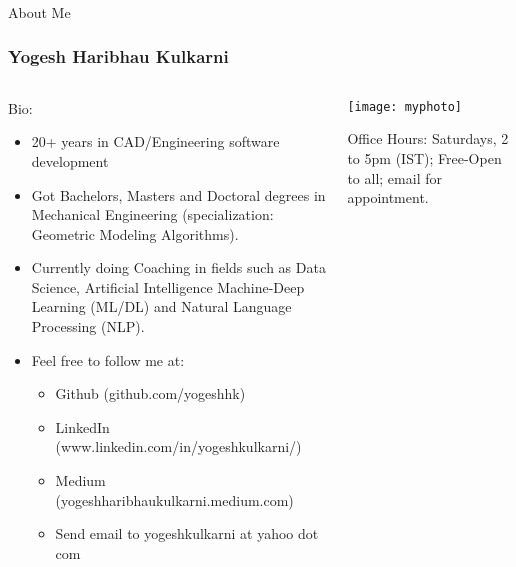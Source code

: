 \begin{frame}[fragile]\frametitle{}
\begin{center}
{\Large About Me}
\end{center}
\end{frame}

\begin{frame}[fragile]\frametitle{Yogesh Haribhau Kulkarni}
\begin{columns}
    \begin{column}[T]{0.7\linewidth}
		Bio:
      \begin{itemize}
		\item 20+ years in CAD/Engineering software development
		\item Got Bachelors, Masters and Doctoral degrees in Mechanical Engineering (specialization: Geometric Modeling Algorithms). 
		\item Currently doing Coaching in fields such as Data Science, Artificial Intelligence Machine-Deep Learning (ML/DL) and Natural Language Processing (NLP).
		\item Feel free to follow me at:
      \begin{itemize}
			\item Github (github.com/yogeshhk)
			\item LinkedIn (www.linkedin.com/in/yogeshkulkarni/)
			\item Medium (yogeshharibhaukulkarni.medium.com)
			\item Send email to yogeshkulkarni at yahoo dot com
			\end{itemize}
	  \end{itemize}
    \end{column}
		
    \begin{column}[T]{0.3\linewidth}
      \centering
      \texttt{[image: myphoto]}
			
			Office Hours: Saturdays, 2 to 5pm (IST); Free-Open to all; email for appointment.
    \end{column}
		
  \end{columns}

\end{frame}



